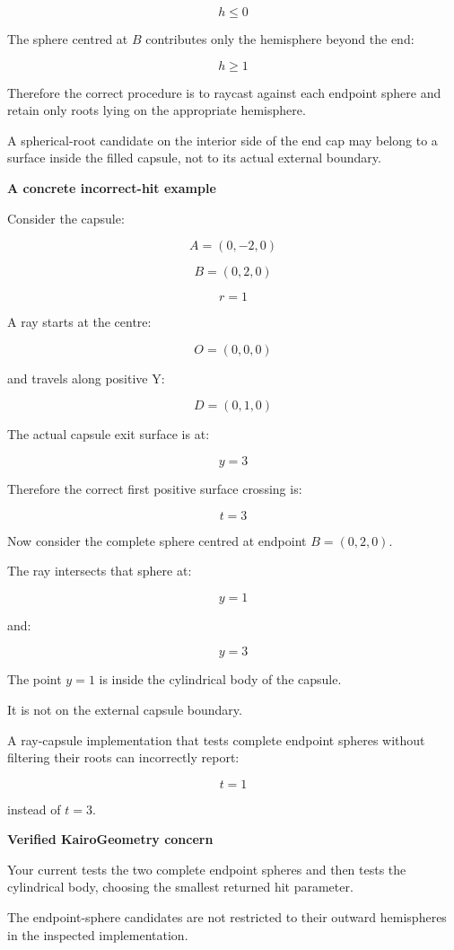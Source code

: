 \[
\boxed{h\le0}
\]

The sphere centred at \(B\) contributes only the hemisphere beyond the end:

\[
\boxed{h\ge1}
\]

Therefore the correct procedure is to raycast against each endpoint sphere and retain only roots lying on the appropriate hemisphere.

A spherical-root candidate on the interior side of the end cap may belong to a surface inside the filled capsule, not to its actual external boundary.

\textbf{A concrete incorrect-hit example}

Consider the capsule:

\[
A=(0,-2,0)
\]

\[
B=(0,2,0)
\]

\[
r=1
\]

A ray starts at the centre:

\[
O=(0,0,0)
\]

and travels along positive Y:

\[
D=(0,1,0)
\]

The actual capsule exit surface is at:

\[
y=3
\]

Therefore the correct first positive surface crossing is:

\[
\boxed{t=3}
\]

Now consider the complete sphere centred at endpoint \(B=(0,2,0)\).

The ray intersects that sphere at:

\[
y=1
\]

and:

\[
y=3
\]

The point \(y=1\) is inside the cylindrical body of the capsule.

It is not on the external capsule boundary.

A ray-capsule implementation that tests complete endpoint spheres without filtering their roots can incorrectly report:

\[
t=1
\]

instead of \(t=3\).

\textbf{Verified KairoGeometry concern}

Your current  tests the two complete endpoint spheres and then tests the cylindrical body, choosing the smallest returned hit parameter.

The endpoint-sphere candidates are not restricted to their outward hemispheres in the inspected implementation.

